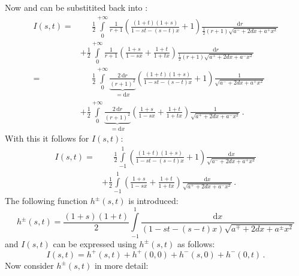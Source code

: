 Now  and  can be substitited back into :
\begin{align}
 I(s,t)
 =& \phantom{+}\,
     \frac{1}{2} \int\limits_{0}^{+\infty}
     \frac{1}{r+1}
     \left(
         \frac{(1+t)(1+s)}{1-st-(s-t)x}
       + 1
     \right)
     \frac{\mathrm{d}r}{\frac{1}{2} (r+1) \sqrt{ a^{-}  + 2 d x + a^{+} x^2 }} \nonumber \\
 ~& +
     \frac{1}{2} \int\limits_{0}^{+\infty}
     \frac{1}{r+1}
     \left(
         \frac{1+s}{1-sx}
       + \frac{1+t}{1+tx}
     \right)
     \frac{\mathrm{d}r}{\frac{1}{2} (r+1) \sqrt{ a^{+}  + 2 d x + a^{-} x^2 }} \nonumber \\
 =& \phantom{+}\,
     \frac{1}{2} \int\limits_{0}^{+\infty}
     \underbrace{\frac{2 \,\mathrm{d}r}{(r+1)^2}}_{=\mathrm{d}x}
     \left(
         \frac{(1+t)(1+s)}{1-st-(s-t)x}
       + 1
     \right)
     \frac{1}{\sqrt{ a^{-}  + 2 d x + a^{+} x^2 }} \nonumber \\
 ~& +
     \frac{1}{2} \int\limits_{0}^{+\infty}
     \underbrace{\frac{2 \,\mathrm{d}r}{(r+1)^2}}_{=\mathrm{d}x}
     \left(
         \frac{1+s}{1-sx}
       + \frac{1+t}{1+tx}
     \right)
     \frac{1}{\sqrt{ a^{+}  + 2 d x + a^{-} x^2 }} \, .
\end{align}
With this it follows for $I(s,t)$:
\begin{align}
 I(s,t)
 =& \phantom{+}\,
     \frac{1}{2} \int\limits_{-1}^{1}
     \left(
         \frac{(1+t)(1+s)}{1-st-(s-t)x}
       + 1
     \right)
     \frac{\mathrm{d}x}{\sqrt{ a^{-}  + 2 d x + a^{+} x^2 }} \nonumber \\
 ~& +
     \frac{1}{2} \int\limits_{-1}^{1}
     \left(
         \frac{1+s}{1-sx}
       + \frac{1+t}{1+tx}
     \right)
     \frac{\mathrm{d}x}{\sqrt{ a^{+}  + 2 d x + a^{-} x^2 }} \, .
\end{align}
The following function $h^{\pm}(s,t)$ is introduced:
\begin{equation}
   h^{\pm}(s,t)
 = \frac{(1+s)(1+t)}{2}
   \int\limits_{-1}^{1}
     \frac{\mathrm{d}x}{\left( 1-st-(s-t)x \right)\sqrt{ a^{\mp}  + 2 d x + a^{\pm} x^2 }}
\end{equation}
and $I(s,t)$ can be expressed using $h^{\pm}(s,t)$ as follows:
\begin{equation}
 I(s,t) = h^{+}(s,t) + h^{+}(0,0) + h^{-}(s,0) + h^{-}(0,t) \, . \label{eqn:I_from_h}
\end{equation}
Now consider $h^{\pm}(s,t)$ in more detail:
